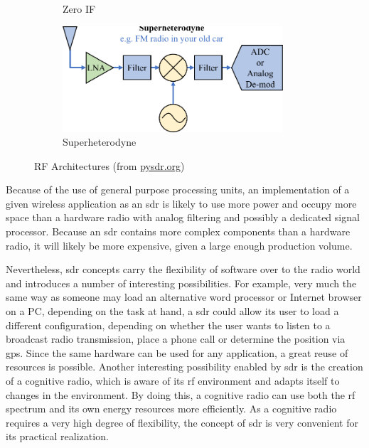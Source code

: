 \begin{figure}[hbtp]
\begin{subfigure}[b]{0.32\textwidth}
         \caption{Zero IF}
         \label{fig:zero-if}
     \end{subfigure}
     \hfill
     \begin{subfigure}[b]{0.32\textwidth}
         \centering
         \includegraphics[width=0.9\textwidth]{figs/superheterodyne.pdf}
         \caption{Superheterodyne}
         \label{fig:superheterodyne}
     \end{subfigure}
    \caption{RF Architectures (from \url{pysdr.org})}
    \label{fig:rf-arch}
\end{figure}

Because of the use of general purpose processing units, an implementation of a given wireless
application as an \gls{sdr} is likely to use more power and occupy more space than a hardware radio
with analog filtering and possibly a dedicated signal processor. Because an \gls{sdr} contains more
complex components than a hardware radio, it will likely be more expensive, given a large
enough production volume.

Nevertheless, \gls{sdr} concepts carry the flexibility of software over to the radio world and introduces a number of interesting possibilities.
For example, very much the same way as someone may load an alternative word processor or Internet
browser on a PC, depending on the task at hand, a \gls{sdr} could allow its user to load a different
configuration, depending on whether the user wants to listen to a broadcast radio transmission,
place a phone call or determine the position via \gls{gps}.%
Since the same hardware can be used
for any application, a great reuse of resources is possible. Another interesting possibility enabled by \gls{sdr} is the creation of a cognitive radio, which is
aware of its \gls{rf} environment and adapts itself to changes in the environment. By doing this,
a cognitive radio can use both the \gls{rf} spectrum and its own energy resources more efficiently.
As a cognitive radio requires a very high degree of flexibility, the concept of \gls{sdr} is very convenient for its practical realization.

